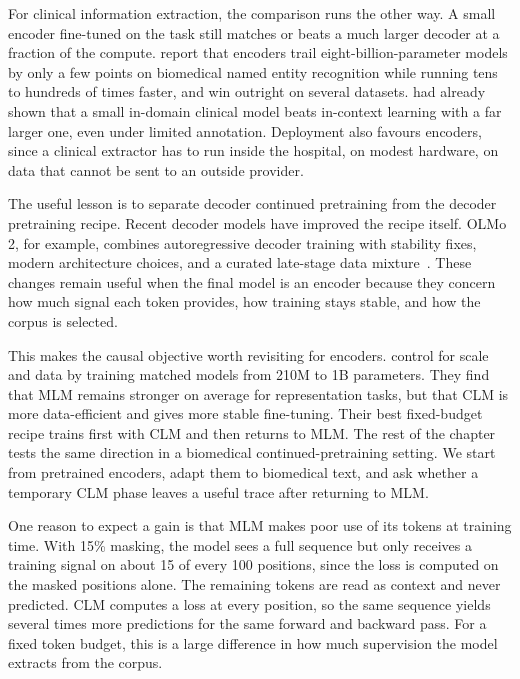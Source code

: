 For clinical information extraction, the comparison runs the other way. A small encoder fine-tuned on the task still matches or beats a much larger decoder at a fraction of the compute. \citet{obeidat_do_2025} report that encoders trail eight-billion-parameter models by only a few points on biomedical named entity recognition while running tens to hundreds of times faster, and win outright on several datasets. \citet{lehman_we_2023} had already shown that a small in-domain clinical model beats in-context learning with a far larger one, even under limited annotation. Deployment also favours encoders, since a clinical extractor has to run inside the hospital, on modest hardware, on data that cannot be sent to an outside provider.

The useful lesson is to separate decoder continued pretraining from the decoder pretraining recipe. Recent decoder models have improved the recipe itself. OLMo 2, for example, combines autoregressive decoder training with stability fixes, modern architecture choices, and a curated late-stage data mixture~\citep{olmo2025furious}. These changes remain useful when the final model is an encoder because they concern how much signal each token provides, how training stays stable, and how the corpus is selected.

This makes the causal objective worth revisiting for encoders. \citet{gisserot2025clm} control for scale and data by training matched models from 210M to 1B parameters. They find that MLM remains stronger on average for representation tasks, but that CLM is more data-efficient and gives more stable fine-tuning. Their best fixed-budget recipe trains first with CLM and then returns to MLM. The rest of the chapter tests the same direction in a biomedical continued-pretraining setting. We start from pretrained encoders, adapt them to biomedical text, and ask whether a temporary CLM phase leaves a useful trace after returning to MLM.

One reason to expect a gain is that MLM makes poor use of its tokens at training time. With 15\% masking, the model sees a full sequence but only receives a training signal on about 15 of every 100 positions, since the loss is computed on the masked positions alone. The remaining tokens are read as context and never predicted. CLM computes a loss at every position, so the same sequence yields several times more predictions for the same forward and backward pass. For a fixed token budget, this is a large difference in how much supervision the model extracts from the corpus.

